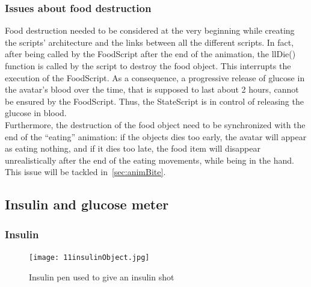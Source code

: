 \fi

    \subsubsection{Issues about food destruction}
\label{foodDestruction}
Food destruction needed to be considered at the very beginning while creating the scripts' architecture and the links between all the different scripts. In fact, after being called by the FoodScript after the end of the animation, the llDie()~\cite{LSLWebsite} function is called by the script to destroy the food object. This interrupts the execution of the FoodScript. As a consequence, a progressive release of glucose in the avatar's blood over the time, that is supposed to last about 2 hours, cannot be ensured by the FoodScript. Thus, the StateScript is in control of releasing the glucose in blood.\\

Furthermore, the destruction of the food object need to be synchronized with the end of the ``eating'' animation: if the objects dies too early, the avatar will appear as eating nothing, and if it dies too late, the food item will disappear unrealistically after the end of the eating movements, while being in the hand. This issue will be tackled in~\ref{sec:animBite}.






\subsection{Insulin and glucose meter}
    \subsubsection{Insulin} 

\begin{figure}[h]
  \caption{Insulin pen used to give an insulin shot}
  \centering
  \texttt{[image: 11insulinObject.jpg]}
  \label{fig:11insulinObject}
\end{figure}

